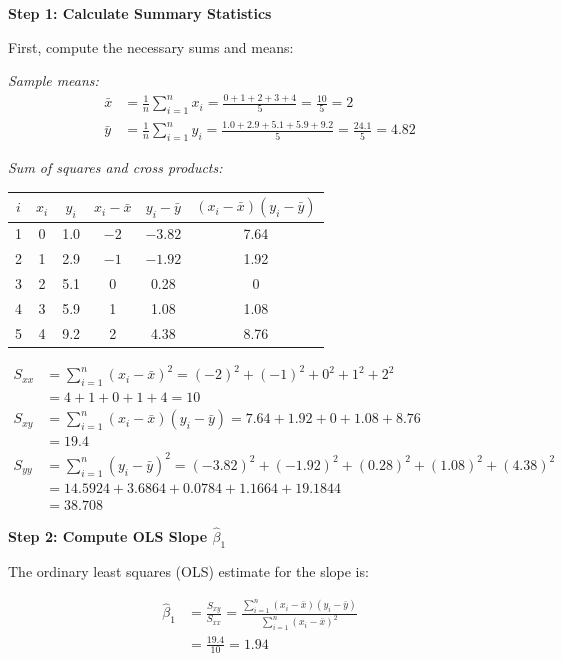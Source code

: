 \documentclass[12pt]{article}
\begin{document}
\begin{solution}
\textbf{Step 1: Calculate Summary Statistics}

First, compute the necessary sums and means:

\textit{Sample means:}
\begin{align*}
\bar{x} &= \frac{1}{n}\sum_{i=1}^{n} x_i = \frac{0 + 1 + 2 + 3 + 4}{5} = \frac{10}{5} = 2 \\
\bar{y} &= \frac{1}{n}\sum_{i=1}^{n} y_i = \frac{1.0 + 2.9 + 5.1 + 5.9 + 9.2}{5} = \frac{24.1}{5} = 4.82
\end{align*}

\textit{Sum of squares and cross products:}

\begin{center}
\begin{tabular}{|c|c|c|c|c|c|}
\hline
$i$ & $x_i$ & $y_i$ & $x_i - \bar{x}$ & $y_i - \bar{y}$ & $(x_i - \bar{x})(y_i - \bar{y})$ \\
\hline
1 & 0 & 1.0 & $-2$ & $-3.82$ & 7.64 \\
2 & 1 & 2.9 & $-1$ & $-1.92$ & 1.92 \\
3 & 2 & 5.1 & 0 & 0.28 & 0 \\
4 & 3 & 5.9 & 1 & 1.08 & 1.08 \\
5 & 4 & 9.2 & 2 & 4.38 & 8.76 \\
\hline
\end{tabular}
\end{center}

\begin{align*}
S_{xx} &= \sum_{i=1}^{n}(x_i - \bar{x})^2 = (-2)^2 + (-1)^2 + 0^2 + 1^2 + 2^2 \\
&= 4 + 1 + 0 + 1 + 4 = 10 \\
S_{xy} &= \sum_{i=1}^{n}(x_i - \bar{x})(y_i - \bar{y}) = 7.64 + 1.92 + 0 + 1.08 + 8.76 \\
&= 19.4 \\
S_{yy} &= \sum_{i=1}^{n}(y_i - \bar{y})^2 = (-3.82)^2 + (-1.92)^2 + (0.28)^2 + (1.08)^2 + (4.38)^2 \\
&= 14.5924 + 3.6864 + 0.0784 + 1.1664 + 19.1844 \\
&= 38.708
\end{align*}

\textbf{Step 2: Compute OLS Slope $\hat{\beta}_1$}

The ordinary least squares (OLS) estimate for the slope is:

\begin{align*}
\hat{\beta}_1 &= \frac{S_{xy}}{S_{xx}} = \frac{\sum_{i=1}^{n}(x_i - \bar{x})(y_i - \bar{y})}{\sum_{i=1}^{n}(x_i - \bar{x})^2} \\
&= \frac{19.4}{10} = 1.94
\end{align*}


\end{solution}
\end{document}
